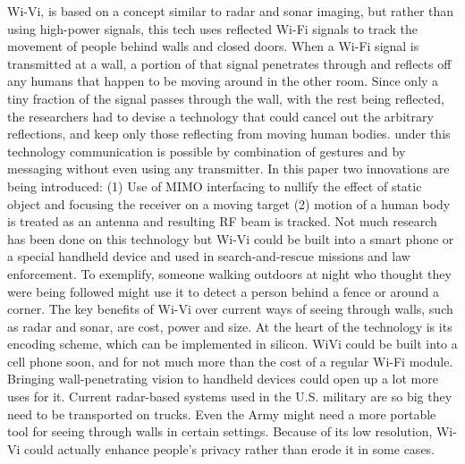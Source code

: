 \documentclass[a4paper,12pt,oneside]{article}
\begin{document}
Wi-Vi, is based on a concept similar to radar and sonar imaging, but rather than using
high-power signals, this tech uses reflected Wi-Fi signals to track the movement of people
behind walls and closed doors. When a Wi-Fi signal is transmitted at a wall, a portion of that
signal penetrates through and reflects off any humans that happen to be moving around in the
other room. Since only a tiny fraction of the signal passes through the wall, with the rest being
reflected, the researchers had to devise a technology that could cancel out the arbitrary
reflections, and keep only those reflecting from moving human bodies. under this technology
communication is possible by combination of gestures and by messaging without even using any
transmitter. In this paper two innovations are being introduced: (1) Use of MIMO interfacing to
nullify the effect of static object and focusing the receiver on a moving target (2) motion of a
human body is treated as an antenna and resulting RF beam is tracked. Not much research has
been done on this technology but Wi-Vi could be built into a smart phone or a special handheld
device and used in search-and-rescue missions and law enforcement.
 To exemplify, someone walking outdoors at night who thought they were being followed
might use it to detect a person behind a fence or around a corner. The key benefits of Wi-Vi over
current ways of seeing through walls, such as radar and sonar, are cost, power and size. At the
heart of the technology is its encoding scheme, which can be implemented in silicon. WiVi could
be built into a cell phone soon, and for not much more than the cost of a regular Wi-Fi module.
Bringing wall-penetrating vision to handheld devices could open up a lot more uses for it.
Current radar-based systems used in the U.S. military are so big they need to be transported on
trucks. Even the Army might need a more portable tool for seeing through walls in certain
settings. Because of its low resolution, Wi-Vi could actually enhance people's privacy rather than
erode it in some cases.
\end{document}
